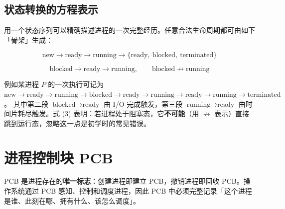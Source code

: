 \subsection{状态转换的方程表示}

\noindent 用一个状态序列可以精确描述进程的一次完整经历。任意合法生命周期都可由如下「骨架」生成：

\begin{equation}
    \text{new} \to \text{ready} \to \text{running}
    \to \{\text{ready},\ \text{blocked},\ \text{terminated}\}
\end{equation}

\begin{equation}
    \text{blocked} \to \text{ready} \to \text{running},
    \qquad
    \text{blocked} \not\to \text{running}
\end{equation}

\noindent 例如某进程 $P$ 的一次执行可记为
$\text{new} \to \text{ready} \to \text{running} \to \text{blocked}
\to \text{ready} \to \text{running} \to \text{ready}
\to \text{running} \to \text{terminated}$。
其中第二段 $\text{blocked} \to \text{ready}$ 由 I/O 完成触发，第三段 $\text{running} \to \text{ready}$ 由时间片耗尽触发。式 (3) 表明：若进程处于阻塞态，它\textbf{不可能}（用 $\not\to$ 表示）直接跳到运行态，忽略这一点是初学时的常见错误。

\section{进程控制块 PCB}

\noindent PCB 是进程存在的\textbf{唯一标志}：创建进程即建立 PCB，撤销进程即回收 PCB。操作系统通过 PCB 感知、控制和调度进程，因此 PCB 中必须完整记录「这个进程是谁、此刻在哪、拥有什么、该怎么调度」。


